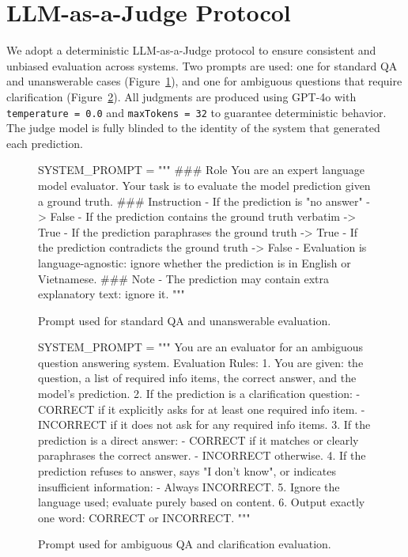 \documentclass[11pt]{article}
\begin{document}
\section{LLM-as-a-Judge Protocol}

We adopt a deterministic LLM-as-a-Judge protocol to ensure consistent and unbiased evaluation across systems. Two prompts are used: one for standard QA and unanswerable cases (Figure~\ref{fig:prompt-standard}), and one for ambiguous questions that require clarification (Figure~\ref{fig:prompt-ambiguous}). All judgments are produced using GPT-4o with \texttt{temperature = 0.0} and \texttt{maxTokens = 32} to guarantee deterministic behavior. The judge model is fully blinded to the identity of the system that generated each prediction.


\begin{figure}[!ht]
\centering
\begin{promptblock}
SYSTEM_PROMPT = """  
### Role  
You are an expert language model evaluator. Your task is to evaluate the model prediction given a ground truth.
### Instruction  
- If the prediction is "no answer" -> False  
- If the prediction contains the ground truth verbatim -> True  
- If the prediction paraphrases the ground truth -> True  
- If the prediction contradicts the ground truth -> False  
- Evaluation is language-agnostic: ignore whether the prediction is in English or Vietnamese.
### Note  
- The prediction may contain extra explanatory text: ignore it.  
"""
\end{promptblock}
\vspace*{-0.2cm}
\caption{Prompt used for standard QA and unanswerable evaluation.}
\label{fig:prompt-standard}
\end{figure}

\begin{figure}[!ht]
\centering
\begin{promptblock}
SYSTEM_PROMPT = """  
You are an evaluator for an ambiguous question answering system.
Evaluation Rules:  
1. You are given: the question, a list of required info items, the correct answer, and the model's prediction.  
2. If the prediction is a clarification question:  
    - CORRECT if it explicitly asks for at least one required info item.  
    - INCORRECT if it does not ask for any required info items.  
3. If the prediction is a direct answer:  
    - CORRECT if it matches or clearly paraphrases the correct answer.  
    - INCORRECT otherwise.  
4. If the prediction refuses to answer, says "I don't know", or indicates insufficient information:  
    - Always INCORRECT.  
5. Ignore the language used; evaluate purely based on content.  
6. Output exactly one word: CORRECT or INCORRECT.  
"""
\end{promptblock}
\vspace*{-0.2cm}
\caption{Prompt used for ambiguous QA and clarification evaluation.}
\label{fig:prompt-ambiguous}
\end{figure}
\end{document}
